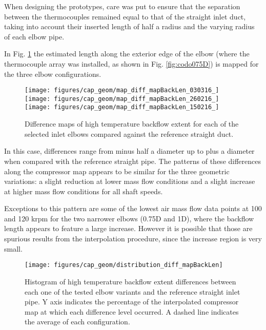 When designing the prototypes, care was put to ensure that the separation between the thermocouples remained equal to that of the straight inlet duct, taking into account their inserted length of half a radius and the varying radius of each elbow pipe.

In Fig. \ref{fig:map_diff_backL} the estimated length along the exterior edge of the elbow (where the thermocouple array was installed, as shown in Fig. \ref{fig:codo075D}) is mapped for the three elbow configurations.

\begin{figure}[htb!]
\centering
\texttt{[image: figures/cap\_geom/map\_diff\_mapBackLen\_030316\_]}\hspace{4mm}
\texttt{[image: figures/cap\_geom/map\_diff\_mapBackLen\_260216\_]}\\[3mm]
\texttt{[image: figures/cap\_geom/map\_diff\_mapBackLen\_150216\_]}\hspace{4mm}
\caption[Difference maps for backflow extent]{Difference maps of high temperature backflow extent for each of the selected inlet elbows compared against the reference straight duct.}
\label{fig:map_diff_backL}
\end{figure}

In this case, differences range from minus half a diameter up to plus a diameter when compared with the reference straight pipe. The patterns of these differences along the compressor map appears to be similar for the three geometric variations: a slight reduction at lower mass flow conditions and a slight increase at higher mass flow conditions for all shaft speeds.

Exceptions to this pattern are some of the lowest air mass flow data points at 100 and 120 krpm for the two narrower elbows (0.75D and 1D), where the backflow length appears to feature a large increase. However it is possible that those are spurious results from the interpolation procedure, since the increase region is very small.

\begin{figure}[htb!]
\centering
\texttt{[image: figures/cap\_geom/distribution\_diff\_mapBackLen]}
\caption[Difference histogram for backflow extent]{Histogram of high temperature backflow extent differences between each one of the tested elbow variants and the reference straight inlet pipe. Y axis indicates the percentage of the interpolated compressor map at which each difference level occurred. A dashed line indicates the average of each configuration.}
\label{fig:distribution_diff_backL}
\end{figure}


